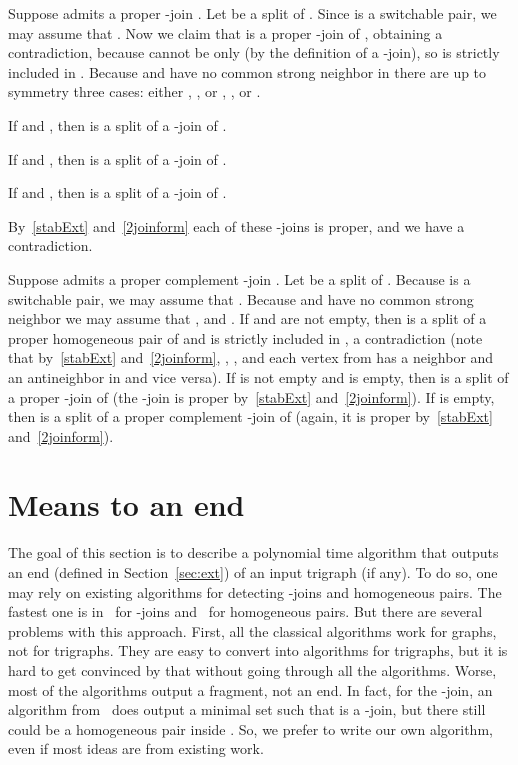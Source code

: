\documentclass[11 pt] {article}
\newcommand\blackslug{\hbox{\hskip 1pt \vrule width 4pt height 8pt depth 1.5pt
        \hskip 1pt}}
\newcommand\bbox{\hfill \quad \blackslug \medbreak}
\newcounter{claim}
\begin{document}
Suppose  admits a proper -join . Let
 be a split of . Since
 is a switchable pair, we may assume that . Now we
claim that  is a proper -join of ,
obtaining a contradiction, because  cannot be only  (by
the definition of a -join), so  is strictly included in .
Because  and  have no common strong neighbor in  there
are up to symmetry three cases: either , , or
, , or .

If  and , then  is
a split of a  -join of .

If  and , then  is a
split of a  -join of .

If  and , then  is a split of a  -join of .

By~\ref{stabExt} and~\ref{2joinform} each of these -joins is proper, and we have a
contradiction.


Suppose  admits a proper complement -join . Let
 be a split of .
Because  is a switchable pair, we may assume that .
Because  and  have no common strong neighbor we may assume that
,  and . If  and  are
not empty, then  is a split of a proper homogeneous
pair of  and  is strictly included in , a
contradiction (note that by~\ref{stabExt} and~\ref{2joinform},
, , and each vertex from  has a
neighbor and an antineighbor in  and vice versa). If  is
not empty and  is empty, then  is a split of a
proper -join of  (the -join is proper by~\ref{stabExt}
and~\ref{2joinform}). If  is empty, then  is a
split of a proper complement -join of  (again, it is proper
by~\ref{stabExt} and~\ref{2joinform}).  \bbox

\section{Means to an end}
\label{sec:end}

The goal of this section is to describe a polynomial time algorithm
that outputs an end (defined in Section~\ref{sec:ext}) of an input
trigraph (if any).  To do so, one may rely on existing algorithms for
detecting -joins and homogeneous pairs.  The fastest one is
in~\cite{ChHaTrVu:2-join} for -joins and~\cite{HaMaMo:HP} for
homogeneous pairs.  But there are several problems with this approach.
First, all the classical algorithms work for graphs, not for
trigraphs.  They are easy to convert into algorithms for trigraphs,
but it is hard to get convinced by that without going through all the
algorithms.  Worse, most of the algorithms output a fragment, not an
end.  In fact, for the -join, an algorithm
from~\cite{ChHaTrVu:2-join} does output a minimal set  such that
 is a -join, but there still could be a
homogeneous pair inside .  So, we prefer to write our own
algorithm, even if most ideas are from existing work.
\end{document}
